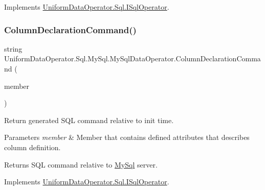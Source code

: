 Implements \mbox{\hyperlink{interface_uniform_data_operator_1_1_sql_1_1_i_sql_operator_a1a6429996e1bbb452f4e034fd634e640}{Uniform\+Data\+Operator.\+Sql.\+I\+Sql\+Operator}}.

\mbox{\label{class_uniform_data_operator_1_1_sql_1_1_my_sql_1_1_my_sql_data_operator_a0bdc2943e5d10576fb564913cdd744e7}} 
\subsubsection{\texorpdfstring{Column\+Declaration\+Command()}{ColumnDeclarationCommand()}}
{\footnotesize\ttfamily string Uniform\+Data\+Operator.\+Sql.\+My\+Sql.\+My\+Sql\+Data\+Operator.\+Column\+Declaration\+Command (\begin{DoxyParamCaption}\item[{Member\+Info}]{member }\end{DoxyParamCaption})}



Return generated S\+QL command relative to init time. 


\begin{DoxyParams}{Parameters}
{\em member} & Member that contains defined attributes that describes column definition.\\
\hline
\end{DoxyParams}
\begin{DoxyReturn}{Returns}
S\+QL command relative to \mbox{\hyperlink{namespace_uniform_data_operator_1_1_sql_1_1_my_sql}{My\+Sql}} server.
\end{DoxyReturn}


Implements \mbox{\hyperlink{interface_uniform_data_operator_1_1_sql_1_1_i_sql_operator_aac9c3ed1e73af66e383340a154786ec7}{Uniform\+Data\+Operator.\+Sql.\+I\+Sql\+Operator}}.

\mbox{\label{class_uniform_data_operator_1_1_sql_1_1_my_sql_1_1_my_sql_data_operator_acf051b5431ee10337b9ab6bc6184d4db}} 
